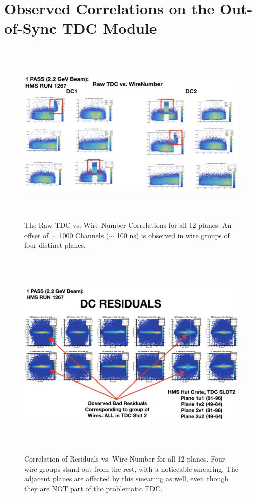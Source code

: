 \documentclass[11pt]{article}
\begin{document}
\section{Observed Correlations on the Out-of-Sync TDC Module}  
\begin{figure}[h!]
  \centering
  \includegraphics[width=6.5in, height=3.5in]{shifted_drifttimes.png}
  \caption{The Raw TDC vs. Wire Number Correlations for all 12 planes. An offset of $\sim$ 1000 Channels ($\sim$ 100 ns) is observed
    in wire groups of four distinct planes.}
  \label{fig:shift_dtimes}
\end{figure}
\begin{figure}[h!]
  \centering
  \includegraphics[width=7.0in, height=4.0in]{bad_wireresidual.png}
  \caption{Correlation of Residuals vs. Wire Number for all 12 planes. Four wire groups stand out from the rest, with a noticeable smearing.
  The adjacent planes are affected by this smearing as well, even though they are NOT part of the problematic TDC.}
  \label{fig:wire_residual}
\end{figure}
\end{document}
